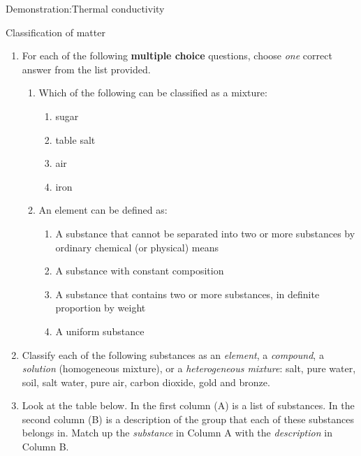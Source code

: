 \begin{gexperiment}{Demonstration:Thermal conductivity}
\begin{eocexercises}{Classification of matter }
{\begin{enumerate}[noitemsep, label=\textbf{\arabic*}. ]
            \label{m38706*uid133}\item For each of the following \textbf{multiple choice} questions, choose \textsl{one} correct answer from the list provided.
\label{m38706*id67947}\begin{enumerate}[noitemsep, label=\textbf{\alph*}. ] 
            \label{m38706*uid134}\item Which of the following can be classified as a mixture:
\label{m38706*id67963}\begin{enumerate}[noitemsep, label=\textbf{\alph*}. ] 
            \label{m38706*uid135}\item sugar
\label{m38706*uid136}\item table salt
\label{m38706*uid137}\item air
\label{m38706*uid138}\item iron
\end{enumerate}
                \label{m38706*uid139}\item An element can be defined as:
\label{m38706*id68029}\begin{enumerate}[noitemsep, label=\textbf{\alph*}. ] 
            \label{m38706*uid140}\item A substance that cannot be separated into two or more substances by ordinary chemical (or physical) means
\label{m38706*uid141}\item A substance with constant composition
\label{m38706*uid142}\item A substance that contains two or more substances, in definite proportion by weight
\label{m38706*uid143}\item A uniform substance
\end{enumerate}
                \end{enumerate}
\label{m38706*uid144}\item Classify each of the following substances as an \textsl{element}, a \textsl{compound}, a \textsl{solution} (homogeneous mixture), or a \textsl{heterogeneous mixture}: salt, pure water, soil, salt water, pure air, carbon dioxide, gold and bronze.\newline
\label{m38706*uid145}\item Look at the table below. In the first column (A) is a list of substances. In the second column (B) is a description of the group that each of these substances belongs in. Match up the \textsl{substance} in Column A with the \textsl{description} in Column B.
          \begin{table}[H]

\end{table}
\end{enumerate}}
\end{eocexercises}
\end{gexperiment}
